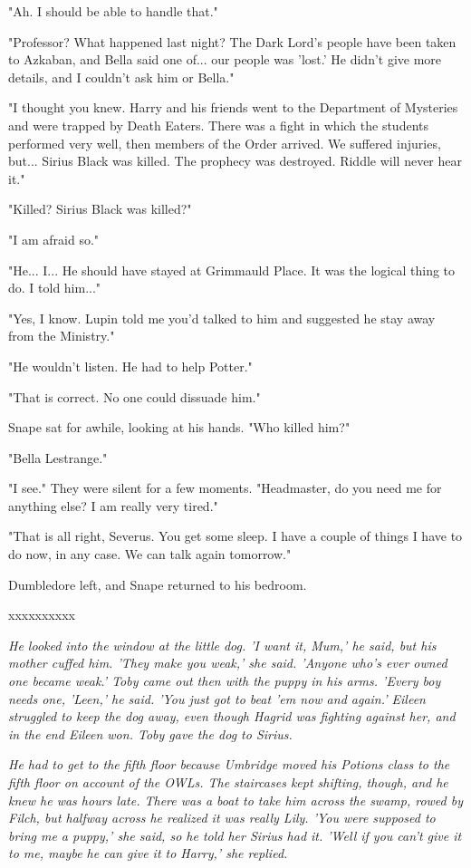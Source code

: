 \documentclass[a4paper,11pt]{article}
\begin{document}
"Ah. I should be able to handle that."

"Professor? What happened last night? The Dark Lord's people have been taken to Azkaban, and Bella said one of... our people was 'lost.' He didn't give more details, and I couldn't ask him or Bella."

"I thought you knew. Harry and his friends went to the Department of Mysteries and were trapped by Death Eaters. There was a fight in which the students performed very well, then members of the Order arrived. We suffered injuries, but... Sirius Black was killed. The prophecy was destroyed. Riddle will never hear it."

"Killed? Sirius Black was killed?"

"I am afraid so."

"He... I... He should have stayed at Grimmauld Place. It was the logical thing to do. I told him..."

"Yes, I know. Lupin told me you'd talked to him and suggested he stay away from the Ministry."

"He wouldn't listen. He had to help Potter."

"That is correct. No one could dissuade him."

Snape sat for awhile, looking at his hands. "Who killed him?"

"Bella Lestrange."

"I see." They were silent for a few moments. "Headmaster, do you need me for anything else? I am really very tired."

"That is all right, Severus. You get some sleep. I have a couple of things I have to do now, in any case. We can talk again tomorrow."

Dumbledore left, and Snape returned to his bedroom.

xxxxxxxxxx

\emph{He looked into the window at the little dog. 'I want it, Mum,' he said, but his mother cuffed him. 'They make you weak,' she said. 'Anyone who's ever owned one became weak.' Toby came out then with the puppy in his arms. 'Every boy needs one, 'Leen,' he said. 'You just got to beat 'em now and again.' Eileen struggled to keep the dog away, even though Hagrid was fighting against her, and in the end Eileen won. Toby gave the dog to Sirius.}

\emph{He had to get to the fifth floor because Umbridge moved his Potions class to the fifth floor on account of the OWLs. The staircases kept shifting, though, and he knew he was hours late. There was a boat to take him across the swamp, rowed by Filch, but halfway across he realized it was really Lily. 'You were supposed to bring me a puppy,' she said, so he told her Sirius had it. 'Well if you can't give it to me, maybe he can give it to Harry,' she replied.}
\end{document}
